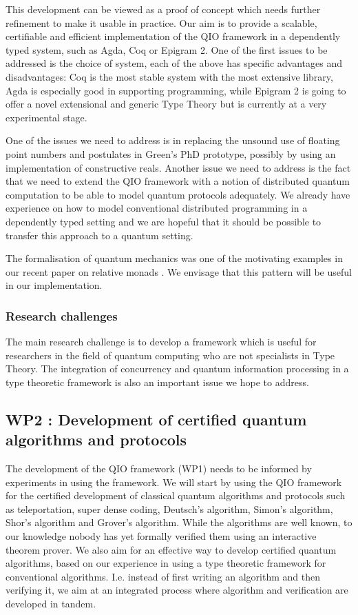 \documentclass[a4paper]{article}
\begin{document}
This development can be viewed as a proof of concept which needs
further refinement to make it usable in practice. Our aim is to
provide a scalable, certifiable and efficient implementation of the QIO
framework in a dependently typed system, such as Agda, Coq or Epigram
2.  One of the first issues to be addressed is the choice of system,
each of the above has specific advantages and disadvantages: Coq is
the most stable system with the most extensive library, Agda is
especially good in supporting programming, while Epigram 2 is going to
offer a novel extensional and generic Type Theory but is currently at
a very experimental stage.

One of the issues we need to address is in replacing the unsound use
of floating point numbers and postulates in Green's PhD prototype,
possibly by using an implementation of constructive reals. Another
issue we need to address is the fact that we need to extend the QIO
framework with a notion of distributed quantum computation to be able
to model quantum protocols adequately. We already have experience on
how to model conventional distributed programming in a dependently
typed setting  and we are hopeful that it should
be possible to transfer this approach to a quantum setting.

The formalisation of quantum mechanics was one of the motivating
examples in our recent paper on relative monads .
We envisage that this pattern will be useful in our implementation.

\subsubsection*{Research challenges}
\label{sec:rsearch-challenges}

The main research challenge is to develop a framework which is useful for
researchers in the field of quantum computing who are not specialists
in Type Theory. The integration of concurrency and quantum information
processing in a type theoretic framework is also an important issue 
we hope to address.

\subsection*{WP2 : Development of certified quantum algorithms and protocols }
\label{sec:wp2}

The development of the QIO framework (WP1) needs to be informed by
experiments in using the framework. 
We will start by using the QIO framework for the
certified development of classical quantum algorithms and protocols
such as teleportation, super dense coding, Deutsch's algorithm,
Simon's algorithm, Shor's algorithm and Grover's algorithm. While the
algorithms are well known, to our knowledge nobody has yet formally
verified them using an interactive theorem prover. We also aim for an
effective way to develop certified quantum algorithms, based on our
experience in using a type theoretic framework for conventional
algorithms. I.e. instead of first writing an algorithm and then
verifying it, we aim at an integrated process where algorithm and
verification are developed in tandem.
\end{document}
